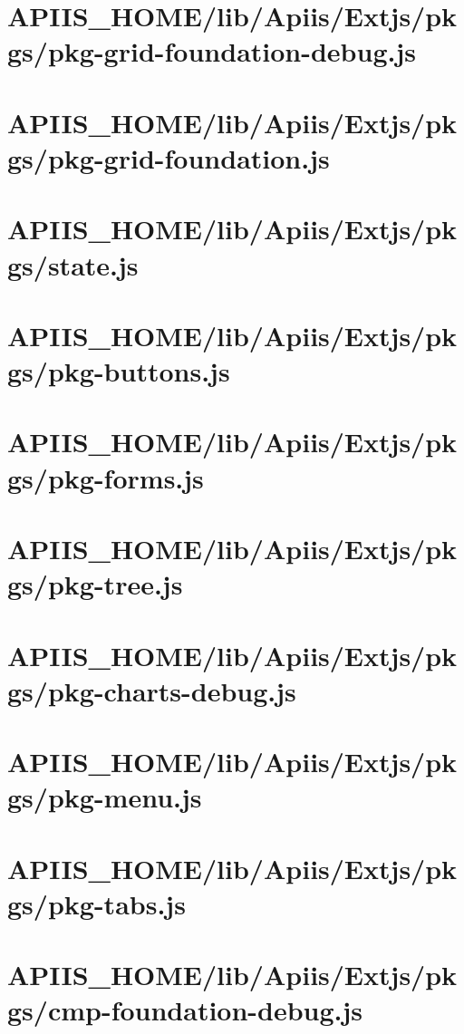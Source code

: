 \section{APIIS\_HOME/lib/Apiis/Extjs/pkgs/pkg-grid-foundation-debug.js} 
\section{APIIS\_HOME/lib/Apiis/Extjs/pkgs/pkg-grid-foundation.js} 
\section{APIIS\_HOME/lib/Apiis/Extjs/pkgs/state.js} 
\section{APIIS\_HOME/lib/Apiis/Extjs/pkgs/pkg-buttons.js} 
\section{APIIS\_HOME/lib/Apiis/Extjs/pkgs/pkg-forms.js} 
\section{APIIS\_HOME/lib/Apiis/Extjs/pkgs/pkg-tree.js} 
\section{APIIS\_HOME/lib/Apiis/Extjs/pkgs/pkg-charts-debug.js} 
\section{APIIS\_HOME/lib/Apiis/Extjs/pkgs/pkg-menu.js} 
\section{APIIS\_HOME/lib/Apiis/Extjs/pkgs/pkg-tabs.js} 
\section{APIIS\_HOME/lib/Apiis/Extjs/pkgs/cmp-foundation-debug.js} 
